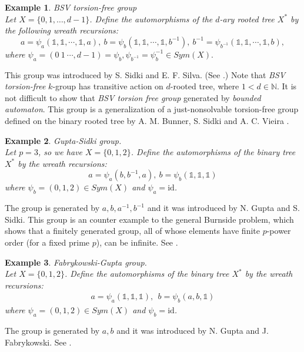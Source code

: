 \documentclass{article}
\newtheorem{myexa}{Example}[section]
\newcommand{\id}{\mathds{1}}
\newcommand{\idperm}{\mathrm{id}}
\begin{document}
 \begin{myexa} BSV torsion-free group \label{BSV-group-ex}\\
	Let $X = \{0, 1, \dots, d-1\}$. Define the automorphisms of the $d$-ary rooted tree $X^*$ by the following wreath recursions:
	\begin{equation} \label{Equation:wr-BSV-group}
	a = \psi_a(\id, \id, \cdots, \id, a),~ b = \psi_b(\id, \id, \cdots, \id, b^{-1}),~ b^{-1} = \psi_{b^{-1}}(\id, \id, \cdots, \id, b),
	\end{equation} where $\psi_a = (0~1~\cdots,d-1) = \psi_b, \psi_{b^{-1}} = \psi_b^{-1} \in Sym(X).$ 
 \end{myexa} 
This group was introduced by S. Sidki and E. F. Silva. (See \cite{sidki2001family}.) Note that {\it BSV torsion-free} $k$-group has transitive action on $d$-rooted tree, where $ 1 < d \in \mathbb{N}$. It is not difficult to show that {\it BSV torsion free group} generated by {\it bounded automaton}. This group is a generalization of a just-nonsolvable torsion-free group defined on the binary rooted tree by A. M. Bunner, S. Sidki and A. C. Vieira \cite{brunner1999just}.
\begin{myexa} Gupta-Sidki group.\\ Let $p =3$, so we have $X = \{0,1,2\}$. Define the automorphisms of the binary tree $X^*$ by the wreath recursions:
	\begin{equation}
	\label{Equation:wr-GS}
	a = \psi_a(b, b^{-1}, a),~ b = \psi_b(\id, \id, \id)
	\end{equation} 
	where $\psi_b = (0,1,2) \in Sym(X)$ and $\psi_a = \idperm$.
\end{myexa} The group is generated by $a, b, a^{-1}, b^{-1}$  and it was introduced by N. Gupta and S. Sidki. This group is an counter example to the general Burnside problem, which shows that a finitely generated group, all of whose elements have finite $p$-power order (for a fixed prime $p$), can be infinite. See \cite{gupta1983burnside}. 
\begin{myexa} Fabrykowski-Gupta group.\\ Let $X = \{0,1,2\}$. Define the automorphisms of the binary tree $X^*$ by the wreath recursions:
	\begin{eqnarray}
	\label{Equation:wr-FG}
	a = \psi_a(\id, \id, \id),~~ b = \psi_b(a,b, \id)
	\end{eqnarray}
	where $\psi_a = (0,1,2) \in Sym(X)$ and $\psi_b = \idperm$.    
\end{myexa} The group is generated by
$a, b$ and it was introduced by N. Gupta and J. Fabrykowski. See \cite{fabrykowski1987groups}. 
\end{document}
